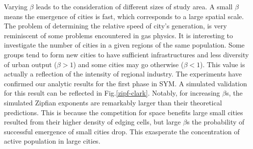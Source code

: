 \documentclass[reprint,unsortedaddress,amsmath,amssymb,aps,prl,showkeys]{revtex4-2}
\begin{document}
Varying $\beta$ leads to the consideration of different sizes of study area. A small $\beta$ means the emergence of cities is fast, which corresponds to a large spatial scale. The problem of determining the relative speed of city's generation, is very reminiscent of some problems encountered in gas physics. It is interesting to investigate the number of cities in a given regions of the same population. Some groups tend to form new cities to have sufficient infrastructures and less diversity of urban output ($\beta > 1$) and some cities may go otherwise ($\beta< 1$). This value is actually a reflection of the intensity of regional industry. The experiments have confirmed our analytic results for the first phase in SYM. A simulated validation for this result can be reflected in Fig.\@\ref{zipf-clark}. Notably, for increasing $\beta$s, the simulated Zipfian exponents are remarkably larger than their theoretical predictions. This is because the competition for space benefits large small cities resulted from their higher density of edging cells, but large $\beta$s the probability of successful emergence of small cities drop. This exasperate the concentration of active population in large cities.
\end{document}
